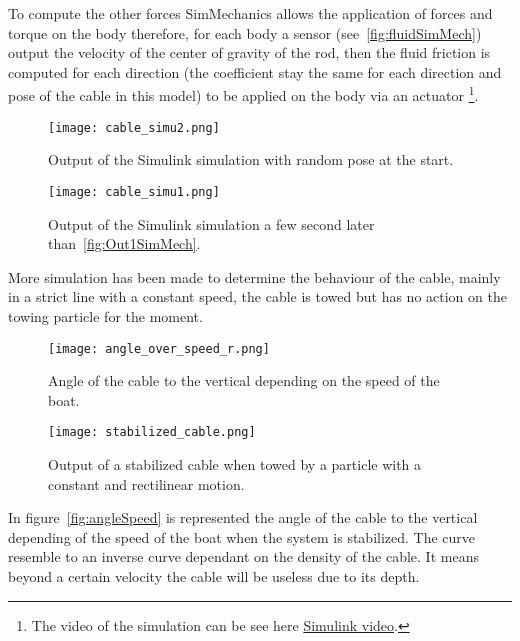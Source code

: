 To compute the other forces SimMechanics allows the application of forces and torque on the body therefore, for each
body a sensor (see~\ref{fig:fluidSimMech}) output the velocity of the center of gravity of the rod, then the 
fluid friction is computed for each direction (the coefficient stay the same for each direction and pose of the cable in this model) to be applied on the body via an actuator \footnote{The video of the simulation can be see here \href{https://youtu.be/xEDApnU54ac}{Simulink video}.}.

\begin{figure}[H]
\centering
    \begin{minipage}[b]{0.5\textwidth}
    \centering
    \texttt{[image: cable\_simu2.png]}
    \caption{Output of the Simulink simulation with random pose at the start.}
    \label{fig:Out1SimMech}
    \end{minipage}
    \hfill
    \begin{minipage}[b]{0.45\textwidth}
    \centering
    \texttt{[image: cable\_simu1.png]}
    \caption{Output of the Simulink simulation a few second later than~\ref{fig:Out1SimMech}.}
    \label{fig:Out2SimMech}
    \end{minipage}
\end{figure}


More simulation has been made to determine the behaviour of the cable, mainly in a strict line with a constant speed, the cable is towed but has no action on the towing particle for the moment.

\begin{figure}[H]
\centering
    \begin{minipage}[b]{0.4\textwidth}
    \centering
    \texttt{[image: angle\_over\_speed\_r.png]}
    \caption{Angle of the cable to the vertical depending on the speed of the boat.}
    \label{fig:angleSpeed}
    \end{minipage}
    \hfill
    \begin{minipage}[b]{0.45\textwidth}
    \centering
    \texttt{[image: stabilized\_cable.png]}
    \caption{Output of a stabilized cable when towed by a particle with a constant and rectilinear motion.}
    \label{fig:stabCable}
    \end{minipage}
\end{figure}

In figure~\ref{fig:angleSpeed} is represented the angle of the cable to the vertical depending of the speed of the 
boat when the system is stabilized. The curve resemble to an inverse curve dependant on the density of the cable.
It means beyond a certain velocity the cable will be useless due to its depth.

